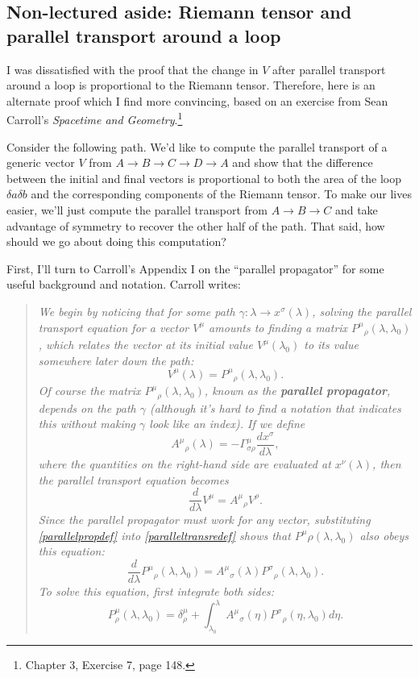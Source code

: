 \subsection*{Non-lectured aside: Riemann tensor and parallel transport around a loop}

I was dissatisfied with the proof that the change in $V$ after parallel transport around a loop is proportional to the Riemann tensor. Therefore, here is an alternate proof which I find more convincing, based on an exercise from Sean Carroll's \textit{Spacetime and Geometry}.\footnote{Chapter 3, Exercise 7, page 148.}

Consider the following path.%
We'd like to compute the parallel transport of a generic vector $V$ from $A\to B\to C \to D \to A$ and show that the difference between the initial and final vectors is proportional to both the area of the loop $\delta a \delta b$ and the corresponding components of the Riemann tensor. To make our lives easier, we'll just compute the parallel transport from $A\to B \to C$ and take advantage of symmetry to recover the other half of the path. That said, how should we go about doing this computation?

First, I'll turn to Carroll's Appendix I on the ``parallel propagator'' for some useful background and notation. Carroll writes:
\begin{quotation}
    \textit{We begin by noticing that for some path $\gamma:\lambda \to x^\sigma(\lambda)$, solving the parallel transport equation for a vector $V^\mu$ amounts to finding a matrix ${P^\mu}_\rho(\lambda,\lambda_0)$, which relates the vector at its initial value $V^\mu(\lambda_0)$ to its value somewhere later down the path:
    \begin{equation}\label{parallelpropdef}
    V^\mu(\lambda)={P^\mu}_\rho(\lambda,\lambda_0).
    \end{equation}
    Of course the matrix ${P^\mu}_\rho(\lambda,\lambda_0)$, known as the \textbf{parallel propagator}, depends on the path $\gamma$ (although it's hard to find a notation that indicates this without making $\gamma$ look like an index). If we define
    $${A^\mu}_\rho(\lambda)=-\Gamma^\mu_{\sigma\rho}\frac{dx^\sigma}{d\lambda},$$ where the quantities on the right-hand side are evaluated at $x^\nu(\lambda)$, then the parallel transport equation becomes
    \begin{equation}\label{paralleltransredef}
    \frac{d}{d\lambda}V^\mu ={A^\mu}_\rho V^\rho.
    \end{equation}
    Since the parallel propagator must work for any vector, substituting \eqref{parallelpropdef} into \eqref{paralleltransredef} shows that ${P^\mu}\rho(\lambda,\lambda_0)$ also obeys this equation:
    $$\frac{d}{d\lambda}{P^\mu}_\rho(\lambda,\lambda_0)={A^\mu}_\sigma(\lambda){P^\sigma}_\rho(\lambda,\lambda_0).$$
    To solve this equation, first integrate both sides:
    $$P^\mu_\rho(\lambda,\lambda_0)=\delta^\mu_\rho+\int_{\lambda_0}^\lambda {A^\mu}_\sigma(\eta){P^\sigma}_\rho(\eta,\lambda_0)d\eta.$$
    }
\end{quotation}

